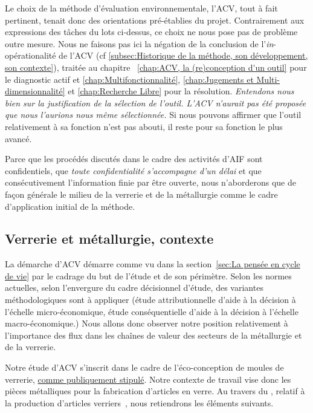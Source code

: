 Le choix de la méthode d'évaluation environnementale, l'ACV, tout à fait pertinent, tenait donc des orientations pré-établies du projet.
Contrairement aux expressions des tâches du lots ci-dessus, ce choix ne nous pose pas de problème outre mesure.
Nous ne faisons pas ici la négation de la conclusion de l'\emph{in}-opérationalité de l'ACV (cf \ref{subsec:Historique de la méthode, son développement, son contexte}), traitée au chapitre ~\ref{chap:ACV, la (re)conception d'un outil} pour le diagnostic actif et \ref{chap:Multifonctionnalité}, \ref{chap:Jugements et Multi-dimensionnalité} et \ref{chap:Recherche Libre} pour la résolution.
\emph{Entendons nous bien sur la justification de la sélection de l'outil.
L'\gls{ACV} n'aurait pas été proposée que nous l'aurions nous même sélectionnée.}
Si nous pouvons affirmer que l'outil relativement à sa fonction n'est pas abouti, il reste pour sa fonction le plus avancé.

Parce que les procédés discutés dans le cadre des activités d'AIF sont confidentiels, que \emph{toute confidentialité s'accompagne d'un délai} et que consécutivement l'information finie par être ouverte,
nous n'aborderons que de façon générale le milieu de la verrerie et de la métallurgie comme le cadre d'application initial de la méthode.

\subsection{Verrerie et métallurgie, contexte}
La démarche d'ACV démarre comme vu dans la section~\ref{sec:La pensée en cycle de vie} par le cadrage du but de l'étude et de son périmètre.
Selon les normes actuelles, selon l'envergure du cadre décisionnel d'étude, des variantes méthodologiques sont à appliquer (étude attributionnelle d'aide à la décision à l'échelle micro-économique, étude conséquentielle d'aide à la décision à l'échelle macro-économique.)
Nous allons donc observer notre position relativement à l'importance des flux dans les chaînes de valeur des secteurs de la métallurgie et de la verrerie.

Notre étude d'\gls{ACV} s'inscrit dans le cadre de l'éco-conception de moules de verrerie, \href{http://www.ademe.fr/motion-econconception-recyclage-doutillage-verrerie}{comme publiquement stipulé}.
Notre contexte de travail vise donc les pièces métalliques pour la fabrication d'articles en verre.
Au travers du , relatif à la production d'articles verriers~\cite{maria_best_2013}, nous retiendrons les éléments suivants.

